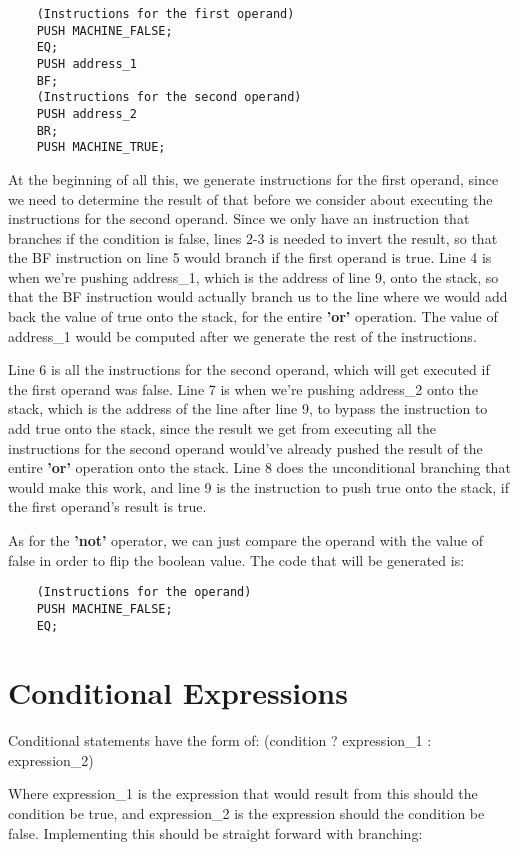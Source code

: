 \documentclass{article}
\begin{document}
\begin{lstlisting}
    (Instructions for the first operand)
    PUSH MACHINE_FALSE;
    EQ;
    PUSH address_1
    BF;
    (Instructions for the second operand)
    PUSH address_2
    BR;
    PUSH MACHINE_TRUE;
\end{lstlisting}

At the beginning of all this, we generate instructions for the first operand, since we need to determine the result of that before we consider about executing the instructions for the second operand. Since we only have an instruction that branches if the condition is false, lines 2-3 is needed to invert the result, so that the BF instruction on line 5 would branch if the first operand is true. Line 4 is when we're pushing address\_1, which is the address of line 9, onto the stack, so that the BF instruction would actually branch us to the line where we would add back the value of true onto the stack, for the entire \textbf{'or'} operation. The value of address\_1 would be computed after we generate the rest of the instructions.

Line 6 is all the instructions for the second operand, which will get executed if the first operand was false. Line 7 is when we're pushing address\_2 onto the stack, which is the address of the line after line 9, to bypass the instruction to add true onto the stack, since the result we get from executing all the instructions for the second operand would've already pushed the result of the entire \textbf{'or'} operation onto the stack. Line 8 does the unconditional branching that would make this work, and line 9 is the instruction to push true onto the stack, if the first operand's result is true.

As for the \textbf{'not'} operator, we can just compare the operand with the value of false in order to flip the boolean value. The code that will be generated is:

\begin{lstlisting}
    (Instructions for the operand)
    PUSH MACHINE_FALSE;
    EQ;
\end{lstlisting}

\section{Conditional Expressions}

Conditional statements have the form of: (condition ? expression\_1 : expression\_2)

Where expression\_1 is the expression that would result from this should the condition be true, and expression\_2 is the expression should the condition be false. Implementing this should be straight forward with branching:
\end{document}
